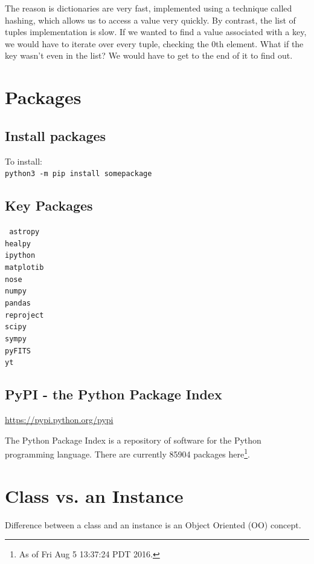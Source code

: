 \documentclass[11pt,a4paper]{article}
\begin{document}
The reason is dictionaries are very fast, implemented using a
technique called hashing, which allows us to access a value very
quickly. By contrast, the list of tuples implementation is slow. If we
wanted to find a value associated with a key, we would have to iterate
over every tuple, checking the 0th element. What if the key wasn’t
even in the list? We would have to get to the end of it to find out.


\newpage
\section{Packages}

\subsection{Install packages}

\noindent
To install: \\
{\tt python3 -m pip install somepackage}


\subsection{Key Packages}
{\tt
astropy \\
healpy\\
ipython \\ 
matplotib\\
nose \\
numpy\\
pandas \\
reproject\\
scipy \\
sympy \\ 
pyFITS\\
yt\\
}


\subsection{PyPI - the Python Package Index}
\noindent
\href{https://pypi.python.org/pypi}{https://pypi.python.org/pypi}

\noindent
The Python Package Index is a repository of software for the Python
programming language. There are currently 85904 packages
here\footnote{As of Fri Aug 5 13:37:24 PDT 2016.}.



\newpage
\section{Class vs. an Instance}
Difference between a class and an instance is an Object Oriented (OO)
concept.
\end{document}
